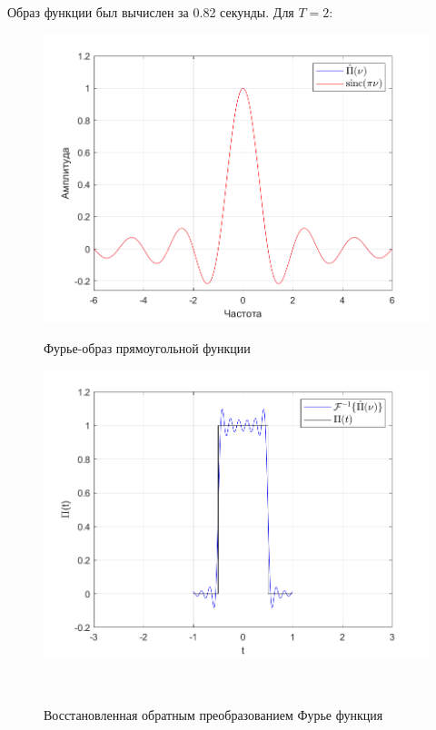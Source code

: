 \documentclass[a4paper]{article}
\begin{document}
Образ функции был вычислен за 0.82 секунды. Для $T = 2$:

\begin{figure}[H]
    \begin{minipage}{0.5\textwidth}
        \centering \includegraphics[width=\textwidth]{graphs/1/T_2_dt_0.001_V_12_dv_0.001/fourier_numerical.png}
        \caption{Фурье-образ прямоугольной функции}
    \end{minipage}\hfill
    \begin{minipage}{0.5\textwidth}
        \centering \includegraphics[width=\textwidth]{graphs/1/T_2_dt_0.001_V_12_dv_0.001/func_inversed_fourier.png}
        \caption{Восстановленная обратным преобразованием Фурье функция}
    \end{minipage}\\[1em]
\end{figure}\noindent\
\end{document}
